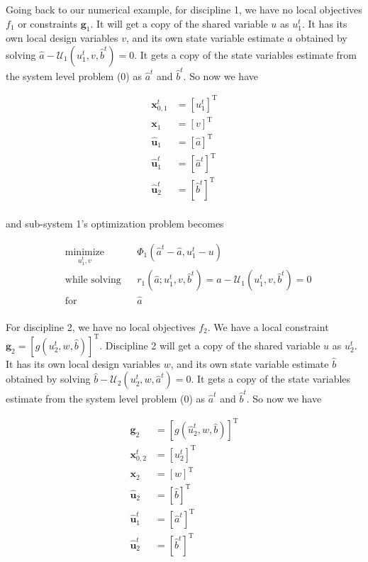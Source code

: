 \documentclass[11pt]{article}
\begin{document}
Going back to our numerical example, for discipline 1, we have no local
objectives \(f_1\) or constraints \(\mathbf{g}_1\). It will get a copy
of the shared variable \(u\) as \(u_1^t\). It has its own local design
variables \(v\), and its own state variable estimate \(\hat{a}\)
obtained by solving \(\hat{a} - \mathcal{U}_1(u_1^t,v,\hat{b}^t)=0\). It
gets a copy of the state variables estimate from the system level
problem (0) as \(\hat{a}^t\) and \(\hat{b}^t\). So now we have

\begin{align*}
\mathbf{x}_{0,1}^t & = \left[u_1^t\right]^\mathrm{T}\\
\mathbf{x}_1 & = \left[v\right]^\mathrm{T}\\
\hat{\mathbf{u}}_1 & = \left[\hat{a}\right]^\mathrm{T}\\
\hat{\mathbf{u}}_1^t & = \left[\hat{a}^t\right]^\mathrm{T}\\
\hat{\mathbf{u}}_2^t & = \left[\hat{b}^t\right]^\mathrm{T}\\
\end{align*}

and sub-system 1's optimization problem becomes

\begin{equation*}
    \begin{aligned}
        & \underset{u_1^t,v}{\text{minimize}}
        & & \Phi_1(\hat{a}^t - \hat{a},u_1^t - u)\\
        & \text{while solving}
        & & r_1(\hat{a};u_1^t,v,\hat{b}^t) = \hat{a} - \mathcal{U}_1(u_1^t,v,\hat{b}^t) = 0\\
        & \text{for}
        & & \hat{a}\\
    \end{aligned}
    \tag{10}
\end{equation*}

For discipline 2, we have no local objectives \(f_2\). We have a local
constraint
\(\mathbf{g}_2 = \left[g({u}_2^t,w,\hat{b})\right]^\mathrm{T}\).
Discipline 2 will get a copy of the shared variable \(u\) as \(u_2^t\).
It has its own local design variables \(w\), and its own state variable
estimate \(\hat{b}\) obtained by solving
\(\hat{b} - \mathcal{U}_2(u_2^t,w,\hat{a}^t)=0\). It gets a copy of the
state variables estimate from the system level problem (0) as
\(\hat{a}^t\) and \(\hat{b}^t\). So now we have

\begin{align*}
\mathbf{g}_2 & = \left[g(\hat{u}_2^t,w,\hat{b})\right]^\mathrm{T}\\
\mathbf{x}_{0,2}^t & = \left[u_2^t\right]^\mathrm{T}\\
\mathbf{x}_2 & = \left[w\right]^\mathrm{T}\\
\hat{\mathbf{u}}_2 & = \left[\hat{b}\right]^\mathrm{T}\\
\hat{\mathbf{u}}_1^t & = \left[\hat{a}^t\right]^\mathrm{T}\\
\hat{\mathbf{u}}_2^t & = \left[\hat{b}^t\right]^\mathrm{T}\\
\end{align*}
\end{document}
